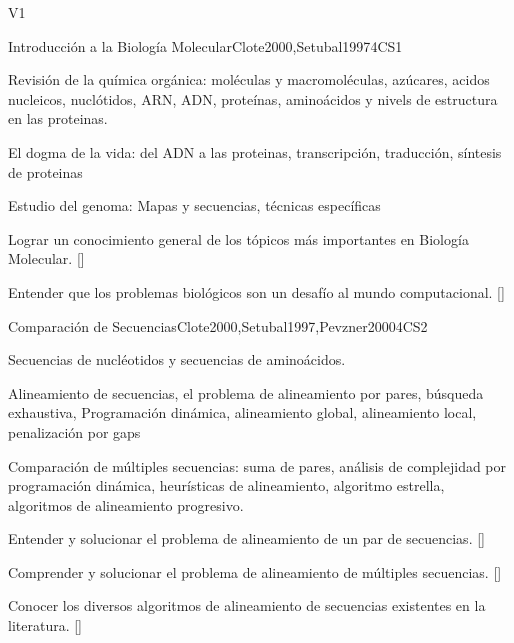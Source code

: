 \begin{syllabus}
\begin{competences}{V1}
    \item {} 
    \item {}
    \item {}
\end{competences}

\begin{unit}{Introducción a la Biología Molecular}{}{Clote2000,Setubal1997}{4}{CS1}
\begin{topics}
    \item Revisión de la química orgánica: moléculas y macromoléculas, azúcares, acidos nucleicos, nuclótidos, ARN, ADN, proteínas, aminoácidos y nivels de estructura en las proteinas. 
    \item El dogma de la vida: del ADN a las proteinas, transcripción, traducción, síntesis de proteinas
    \item Estudio del genoma: Mapas y secuencias, técnicas específicas
\end{topics}
\begin{learningoutcomes}
    \item  Lograr un conocimiento general de los tópicos más importantes en Biología Molecular. [\Familiarity]
    \item Entender que los problemas biológicos son un desafío al mundo computacional. [\Assessment]
\end{learningoutcomes}
\end{unit}

\begin{unit}{Comparación de Secuencias}{}{Clote2000,Setubal1997,Pevzner2000}{4}{CS2}
\begin{topics}
    \item Secuencias de nucléotidos y secuencias de aminoácidos.
    \item Alineamiento de secuencias, el problema de alineamiento por pares, búsqueda exhaustiva, Programación dinámica, alineamiento global, alineamiento local, penalización por gaps
    \item Comparación de múltiples secuencias: suma de pares, análisis de complejidad por programación dinámica, heurísticas de alineamiento, algoritmo estrella, algoritmos de alineamiento progresivo.
\end{topics}
\begin{learningoutcomes}
    \item  Entender y solucionar el problema de alineamiento de un par de secuencias. [\Usage]
    \item  Comprender y solucionar el problema de alineamiento de múltiples secuencias. [\Usage]
    \item Conocer los diversos algoritmos de alineamiento de secuencias existentes en la literatura. [\Familiarity]
\end{learningoutcomes}
\end{unit}


\end{syllabus}
